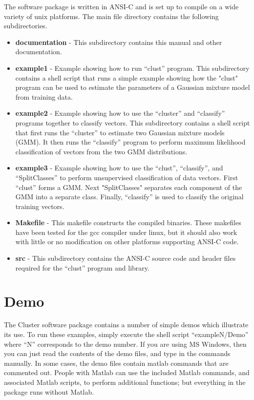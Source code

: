 \documentclass[12pt]{article}
\begin{document}
The software package is written in ANSI-C and is set
up to compile on a wide variety of unix platforms.
The main file directory contains the following subdirectories.

\begin{itemize}

\item[]{\bf documentation} - This subdirectory
contains this manual and other documentation.

\item[]{\bf example1} - 
Example showing how to run ``clust'' program.
This subdirectory contains a shell script that runs a simple
example showing how the "clust" program can be used
to estimate the parameters of a Gaussian mixture model
from training data.

\item[]{\bf example2} - 
Example showing how to use the ``cluster'' and ``classify''
programs together to classify vectors.
This subdirectory contains a shell script that first runs
the ``cluster'' to estimate two Gaussian mixture models (GMM).
It then runs the ``classify'' program to perform maximum
likelihood classification of vectors from the
two GMM distributions.

\item[]{\bf example3} - 
Example showing how to use the ``clust'', ``classify'', and ``SplitClasses''
to perform unsupervised classification of data vectors.
First ``clust'' forms a GMM. Next "SplitClasses" separates each component
of the GMM into a separate class. Finally, ``classify'' is used to classify
the original training vectors.

\item[]{\bf Makefile} - This makefile constructs the compiled binaries.
These makefiles have been tested for the gcc compiler under linux,
but it should also work with little or no modification on other platforms
supporting ANSI-C code. 

\item[]{\bf src} - This subdirectory contains the ANSI-C source
code and header files required for the ``clust'' program and library.

\end{itemize}




\section{Demo}
\label{sec:demo}

The Cluster software package contains 
a number of simple demos which illustrate its use.
To run these examples, simply execute the shell script
\mbox{``exampleN/Demo''} where ``N'' corresponds
to the demo number.
If you are using MS Windows, then you can just read
the contents of the demo files, and type in the commands
manually. 
In some cases, the demo files contain matlab commands
that are commented out. 
People with Matlab can use the included Matlab commands,
and associated Matlab scripts, to perform additional functions;
but everything in the package runs without Matlab.
\end{document}

